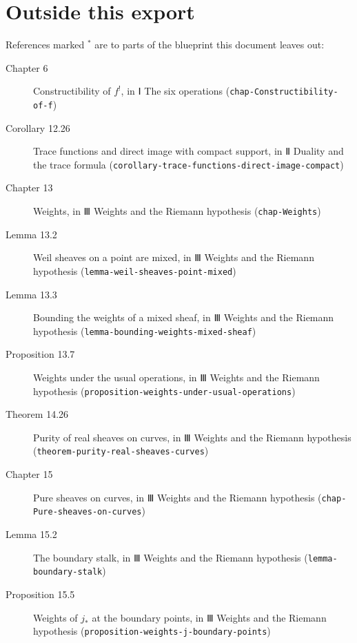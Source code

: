 \documentclass[11pt]{article}
\newcommand{\bpslug}[1]{\texttt{#1}}
\begin{document}
\clearpage{}\hypertarget{bp-outside}{}%
\section*{Outside this export}
References marked \ensuremath{{}^\ast} are to parts of the blueprint this document leaves out:
\begin{description}
\item[Chapter 6] Constructibility of $f^!$, in Ⅰ The six operations (\bpslug{chap-{}\allowbreak{}Constructibility-{}\allowbreak{}of-{}\allowbreak{}f})
\item[Corollary 12.26] Trace functions and direct image with compact support, in Ⅱ Duality and the trace formula (\bpslug{corollary-{}\allowbreak{}trace-{}\allowbreak{}functions-{}\allowbreak{}direct-{}\allowbreak{}image-{}\allowbreak{}compact})
\item[Chapter 13] Weights, in Ⅲ Weights and the Riemann hypothesis (\bpslug{chap-{}\allowbreak{}Weights})
\item[Lemma 13.2] Weil sheaves on a point are mixed, in Ⅲ Weights and the Riemann hypothesis (\bpslug{lemma-{}\allowbreak{}weil-{}\allowbreak{}sheaves-{}\allowbreak{}point-{}\allowbreak{}mixed})
\item[Lemma 13.3] Bounding the weights of a mixed sheaf, in Ⅲ Weights and the Riemann hypothesis (\bpslug{lemma-{}\allowbreak{}bounding-{}\allowbreak{}weights-{}\allowbreak{}mixed-{}\allowbreak{}sheaf})
\item[Proposition 13.7] Weights under the usual operations, in Ⅲ Weights and the Riemann hypothesis (\bpslug{proposition-{}\allowbreak{}weights-{}\allowbreak{}under-{}\allowbreak{}usual-{}\allowbreak{}operations})
\item[Theorem 14.26] Purity of real sheaves on curves, in Ⅲ Weights and the Riemann hypothesis (\bpslug{theorem-{}\allowbreak{}purity-{}\allowbreak{}real-{}\allowbreak{}sheaves-{}\allowbreak{}curves})
\item[Chapter 15] Pure sheaves on curves, in Ⅲ Weights and the Riemann hypothesis (\bpslug{chap-{}\allowbreak{}Pure-{}\allowbreak{}sheaves-{}\allowbreak{}on-{}\allowbreak{}curves})
\item[Lemma 15.2] The boundary stalk, in Ⅲ Weights and the Riemann hypothesis (\bpslug{lemma-{}\allowbreak{}boundary-{}\allowbreak{}stalk})
\item[Proposition 15.5] Weights of $j_*$ at the boundary points, in Ⅲ Weights and the Riemann hypothesis (\bpslug{proposition-{}\allowbreak{}weights-{}\allowbreak{}j-{}\allowbreak{}boundary-{}\allowbreak{}points})

\end{description}
\end{document}
